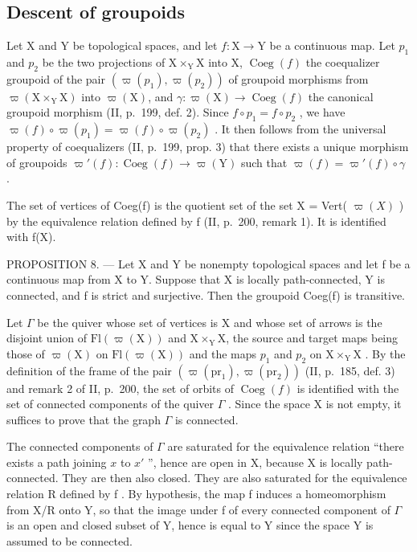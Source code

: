 \subsection{Descent of groupoids}

Let X and Y be topological spaces, and let \(f\colon\mathrm{X}\to\mathrm{Y}\) be a continuous map. Let \(p_{1}\) and \(p_{2}\) be the two projections of \(\mathrm{X}\times_{\mathrm{Y}}\mathrm{X}\) into X, \(\operatorname{Coeg}(f)\) the coequalizer groupoid of the pair \((\varpi(p_{1}),\varpi(p_{2}))\) of groupoid morphisms from \(\varpi(\mathrm{X}\times_{\mathrm{Y}}\mathrm{X})\) into \(\varpi(\mathrm{X})\), and \(\gamma\colon\varpi(\mathrm{X})\to\operatorname{Coeg}(f)\) the canonical groupoid morphism (II, p.~199, def. 2). Since \(f\circ p_{1}=f\circ p_{2}\) , we have \(\varpi(f)\circ\varpi(p_{1})=\varpi(f)\circ\varpi(p_{2})\) . It then follows from the universal property of coequalizers (II, p.~199, prop. 3) that there exists a unique morphism of groupoids \(\varpi'(f)\colon\operatorname{Coeg}(f)\to\varpi(\mathrm{Y})\) such that \(\varpi(f)=\varpi'(f)\circ\gamma\) .

The set of vertices of Coeg(f) is the quotient set of the set X = Vert( \(\varpi(X)\) ) by the equivalence relation defined by f (II, p.~200, remark 1). It is identified with f(X).

PROPOSITION 8. --- Let X and Y be nonempty topological spaces and let f be a continuous map from X to Y. Suppose that X is locally path-connected, Y is connected, and f is strict and surjective. Then the groupoid Coeg(f) is transitive.

Let \(\Gamma\) be the quiver whose set of vertices is X and whose set of arrows is the disjoint union of \(\mathrm{Fl}(\varpi(\mathrm{X}))\) and \(\mathrm{X}\times_{\mathrm{Y}}\mathrm{X}\), the source and target maps being those of \(\varpi(\mathrm{X})\) on \(\mathrm{Fl}(\varpi(\mathrm{X}))\) and the maps \(p_1\) and \(p_2\) on \(\mathrm{X}\times_{\mathrm{Y}}\mathrm{X}\) . By the definition of the frame of the pair \((\varpi(\mathrm{pr}_1), \varpi(\mathrm{pr}_2))\) (II, p.~185, def. 3) and remark 2 of II, p.~200, the set of orbits of \(\operatorname{Coeg}(f)\) is identified with the set of connected components of the quiver \(\Gamma\) . Since the space X is not empty, it suffices to prove that the graph \(\Gamma\) is connected.

The connected components of \(\Gamma\) are saturated for the equivalence relation “there exists a path joining \(x\) to \(x'\) ”, hence are open in X, because X is locally path-connected. They are then also closed. They are also saturated for the equivalence relation R defined by f . By hypothesis, the map f induces a homeomorphism from X/R onto Y, so that the image under f of every connected component of \(\Gamma\) is an open and closed subset of Y, hence is equal to Y since the space Y is assumed to be connected.

